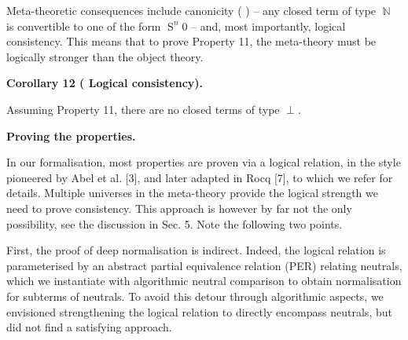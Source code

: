 \documentclass[10pt,a4paper]{amsart}
\begin{document}
 
 
Meta-theoretic consequences include canonicity ( ) – any closed term of type $\operatorname{\mathbb{N}}$ is convertible to one of the form $\operatorname{S}^{n}0$ – and, most importantly, logical consistency. This means that to prove Property 11, the meta-theory must be logically stronger than the object theory.\par
 
 
 
\par\medskip\noindent\textbf{Corollary 12 (  Logical consistency).}\par
 
 
Assuming Property 11, there are no closed terms of type $\operatorname{\bot}$.\par
 
 
 
 
 
\par\medskip\noindent\textbf{Proving the properties.}\par
 
 
In our formalisation, most properties are proven via a logical relation, in the style pioneered by Abel et al. [3], and later adapted in Rocq [7], to which we refer for details. Multiple universes in the meta-theory provide the logical strength we need to prove consistency. This approach is however by far not the only possibility, see the discussion in Sec. 5. Note the following two points.\par
 
 
 
First, the proof of deep normalisation is indirect. Indeed, the logical relation is parameterised by an abstract partial equivalence relation (PER) relating neutrals, which we instantiate with algorithmic neutral comparison to obtain normalisation for subterms of neutrals. To avoid this detour through algorithmic aspects, we envisioned strengthening the logical relation to directly encompass neutrals, but did not find a satisfying approach.\par
 
\end{document}

